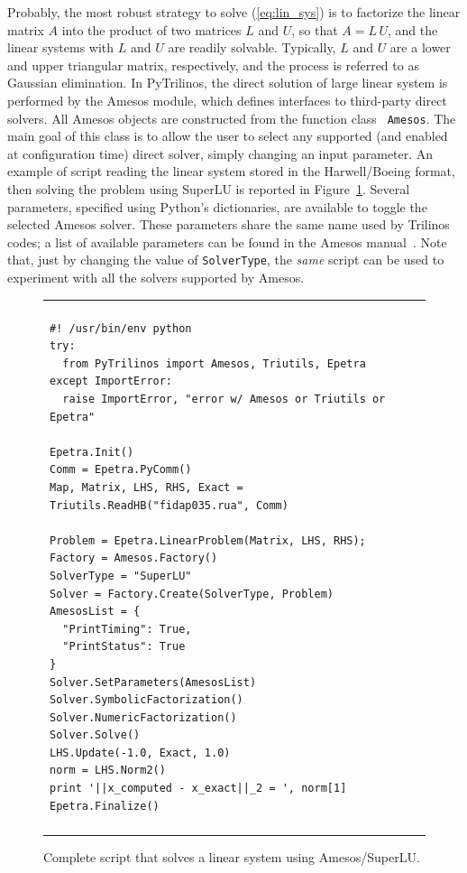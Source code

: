 \documentclass[10pt,relax]{SANDreport}
\begin{document}
Probably, the most robust strategy to solve (\ref{eq:lin_sys})
is to factorize the linear matrix $A$ into the product of two matrices
$L$ and $U$, so that $A = L \, U$, and the linear systems with $L$ and
$U$ are readily solvable. Typically, $L$ and $U$ are a lower and upper
triangular matrix, respectively, and the process is referred to as
Gaussian elimination. In PyTrilinos, the direct solution of large linear
system is performed by the Amesos module, which defines interfaces to
third-party direct solvers.
All Amesos objects are constructed from the function class {\tt
  Amesos}.   The main goal of this class is to allow the user to select
any supported (and enabled at configuration time) direct solver,
simply changing an input parameter. An example of script reading the linear
system stored in the Harwell/Boeing format, then solving the problem using
SuperLU is reported in Figure~\ref{fig:amesos}.
Several parameters, specified using Python's dictionaries, are available to
toggle the selected Amesos solver. These parameters share the same name used
by Trilinos codes; a list of available parameters can be found in the Amesos
manual~\cite{Amesos-Reference-Guide}. Note that, just by changing the value of
\verb!SolverType!, the {\sl same} script can be used to experiment with all
the solvers supported by Amesos.

\begin{figure}
\begin{center}
\begin{tabular}{| p{12cm} |}
\hline
\\
\footnotesize
\begin{minipage}{11.5cm}
\begin{verbatim}
#! /usr/bin/env python
try:
  from PyTrilinos import Amesos, Triutils, Epetra
except ImportError:
  raise ImportError, "error w/ Amesos or Triutils or Epetra"

Epetra.Init()
Comm = Epetra.PyComm()
Map, Matrix, LHS, RHS, Exact = Triutils.ReadHB("fidap035.rua", Comm)

Problem = Epetra.LinearProblem(Matrix, LHS, RHS);
Factory = Amesos.Factory()
SolverType = "SuperLU"
Solver = Factory.Create(SolverType, Problem)
AmesosList = {
  "PrintTiming": True,
  "PrintStatus": True
}
Solver.SetParameters(AmesosList)
Solver.SymbolicFactorization()
Solver.NumericFactorization()
Solver.Solve()
LHS.Update(-1.0, Exact, 1.0)
norm = LHS.Norm2()
print '||x_computed - x_exact||_2 = ', norm[1]
Epetra.Finalize()
\end{verbatim}
\end{minipage}
\\
\\
\hline
\end{tabular}
\caption{Complete script that solves a linear system using Amesos/SuperLU.}
\label{fig:amesos}
\end{center}
\end{figure}
\end{document}
